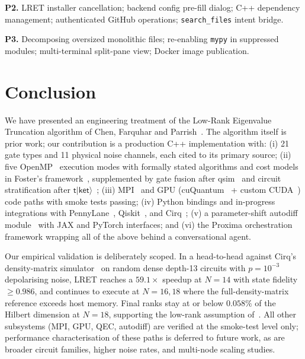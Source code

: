 \documentclass[11pt,a4paper]{article}
\begin{document}
\textbf{P2.} LRET installer cancellation; backend config pre-fill dialog; C++
dependency management; authenticated GitHub operations; \texttt{search\_files}
intent bridge.

\textbf{P3.} Decomposing oversized monolithic files; re-enabling \texttt{mypy} in
suppressed modules; multi-terminal split-pane view; Docker image publication.

\section{Conclusion}
\label{sec:conclusion}

We have presented an engineering treatment of the Low-Rank Eigenvalue Truncation
algorithm of Chen, Farquhar and Parrish~\cite{chen2021lret}. The algorithm itself is
prior work; our contribution is a production C++ implementation with:
(i) 21 gate types and 11 physical noise channels, each cited to its primary source;
(ii) five OpenMP~\cite{dagummenon1998} execution modes with formally stated
algorithms and cost models in Foster's framework~\cite{foster1995}, supplemented by
gate fusion after qsim~\cite{qsim} and circuit stratification after
$\mathsf{t\vert ket\rangle}$~\cite{sivarajah2020tket};
(iii) MPI~\cite{gropp1999mpi} and GPU (cuQuantum~\cite{bayraktar2023cuquantum} +
custom CUDA~\cite{nickolls2008cuda}) code paths with smoke tests passing;
(iv) Python bindings and in-progress integrations with
PennyLane~\cite{bergholm2018pennylane}, Qiskit~\cite{javadi2024qiskit}, and
Cirq~\cite{cirq};
(v) a parameter-shift autodiff module~\cite{mitarai2018,schuld2019} with JAX and
PyTorch interfaces; and
(vi) the Proxima orchestration framework wrapping all of the above behind a
conversational agent.

Our empirical validation is deliberately scoped. In a head-to-head against Cirq's
density-matrix simulator~\cite{cirq} on random dense depth-13 circuits with
$p=10^{-3}$ depolarising noise, LRET reaches a $59.1\times$ speedup at $N=14$ with
state fidelity $\ge 0.986$, and continues to execute at $N=16, 18$ where the
full-density-matrix reference exceeds host memory. Final ranks stay at or below
$0.058\%$ of the Hilbert dimension at $N=18$, supporting the low-rank assumption
of~\cite{chen2021lret}. All other subsystems (MPI, GPU, QEC, autodiff) are verified
at the smoke-test level only; performance characterisation of these paths is
deferred to future work, as are broader circuit families, higher noise rates, and
multi-node scaling studies.
\end{document}
